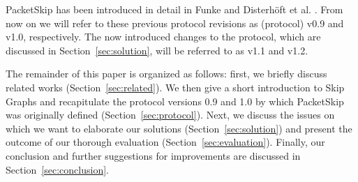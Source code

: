 PacketSkip has been introduced in detail in Funke \cite{packetskip09} and Disterh{\"o}ft et al. \cite{packetskip10}.
From now on we will refer to these previous protocol revisions as (protocol) v0.9 and v1.0, respectively.
The now introduced changes to the protocol, which are discussed in Section~\ref{sec:solution}, will be referred to as v1.1 and v1.2.

The remainder of this paper is organized as follows: first, we briefly discuss related works (Section~\ref{sec:related}). We then give a short introduction to Skip Graphs and recapitulate the protocol versions 0.9 and 1.0 by which PacketSkip was originally defined (Section~\ref{sec:protocol}). Next, we discuss the issues on which we want to elaborate our solutions (Section~\ref{sec:solution}) and present the outcome of our thorough evaluation (Section~\ref{sec:evaluation}). Finally, our conclusion and further suggestions for improvements are discussed in Section~\ref{sec:conclusion}.
